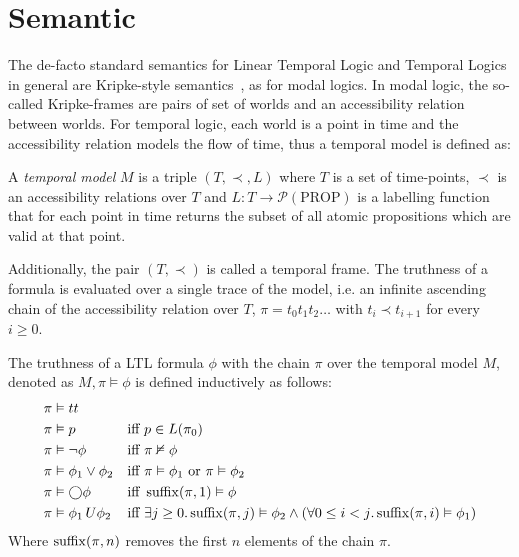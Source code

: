 \section{Semantic}

The de-facto standard semantics for Linear Temporal Logic and Temporal Logics in general are Kripke-style
semantics~\cite{gasquet_kripkes_2011}, as for modal logics. In modal logic, the so-called Kripke-frames are pairs of set
of worlds and an accessibility relation between worlds. For temporal logic, each world is a point in time and the
accessibility relation models the flow of time, thus a temporal model is defined as:

\begin{definition}
  A \emph{temporal model} $M$ is a triple $(T, \prec, L)$ where $T$ is a set of time-points, $\prec$ is an accessibility
  relations over $T$ and $L : T \to \mathcal{P}(\text{PROP})$ is a labelling function that for each point in time
  returns the subset of all atomic propositions which are valid at that point.
\end{definition}

Additionally, the pair $(T, \prec)$ is called a temporal frame. The truthness of a formula is evaluated over a single
trace of the model, i.e. an infinite ascending chain of the accessibility relation over $T$,
$\pi = t_0t_1t_2\ldots$ with $t_i \prec t_{i+1}$ for every $i \geq 0$.

\begin{definition}
  The truthness of a LTL formula $\phi$ with the chain $\pi$ over the temporal model $M$, denoted as
  $M, \pi \vDash \phi$ is defined inductively as follows:
  \begin{align*}
    \pi &\vDash tt && \\
    \pi &\vDash p &&\text{iff } p \in L(\pi_0) \\
    \pi &\vDash \neg\phi &&\text{iff } \pi \nvDash \phi \\
    \pi &\vDash \phi_1 \lor \phi_2 &&\text{iff } \pi \vDash \phi_1 \text{ or } \pi \vDash \phi_2 \\
    \pi &\vDash \bigcirc{\phi} &&\text{iff } \operatorname{suffix}(\pi, 1) \vDash \phi \\
    \pi &\vDash {\phi_1}\,U {\phi_2} &&\text{iff } \exists {j \geq 0} \ldotp {\operatorname{suffix}(\pi, j) \vDash \phi_2 \land
      (\forall {0 \leq i < j} \ldotp {\operatorname{suffix}(\pi, i) \vDash \phi_1})}
  \end{align*}
  Where $\operatorname{suffix}(\pi, n)$ removes the first $n$ elements of the chain $\pi$.
\end{definition}

